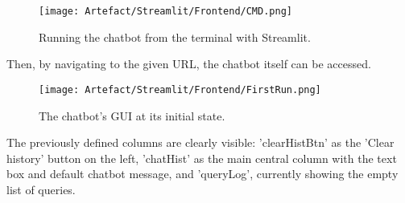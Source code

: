 \begin{figure}[H]
    \centering
    \texttt{[image: Artefact/Streamlit/Frontend/CMD.png]}
    \caption{Running the chatbot from the terminal with Streamlit. \label{fig:RunApp}}
\end{figure}

\noindent Then, by navigating to the given URL, the chatbot itself can be accessed.

\begin{figure}[H]
    \centering
    \texttt{[image: Artefact/Streamlit/Frontend/FirstRun.png]}
    \caption{The chatbot's GUI at its initial state. \label{fig:FirstRun}}
\end{figure}

\noindent The previously defined columns are clearly visible: 'clearHistBtn' as the 'Clear history' button on the left, 'chatHist' as the main 
central column with the text box and default chatbot message, and 'queryLog', currently showing the empty list of queries.